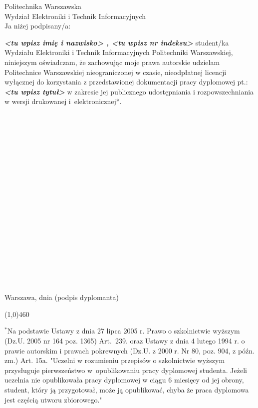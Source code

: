 \newpage
\thispagestyle{empty}
\phantom{Nothing here}
\newpage
\clearpage
\phantom{Here neither}

\setcounter{page}{9}
\vspace{-1.5cm}
\begin{flushleft}
	Politechnika Warszawska \\ 
	Wydział Elektroniki i Technik Informacyjnych  \\
	\vspace{0.5cm}
	Ja niżej podpisany/a: 
\end{flushleft}
\center \textit{\textbf{<tu wpisz imię i nazwisko> , <tu wpisz nr indeksu> }} %
\justify student/ka Wydziału Elektroniki i Technik Informacyjnych Politechniki Warszawskiej, niniejszym oświadczam, że zachowując moje prawa autorskie udzielam Politechnice Warszawskiej nieograniczonej w czasie, nieodpłatnej licencji wyłącznej do korzystania z przedstawionej dokumentacji pracy dyplomowej pt.:
\center \textit{\textbf{ <tu wpisz tytuł> }} 
\justify w zakresie jej publicznego udostępniania i rozpowszechniania w wersji drukowanej i~elektronicznej*.
\\~\\~\\~\\~\\~\\~\\~\\~\\~\\~\\~\\~\\~\\~\\~\\~\\~\\~\\~\\
Warszawa, dnia  \hfill (podpis dyplomanta) 

\begin{center}
	\color{sapphire}
	\line(1,0){460}
\end{center}
\footnotesize \noindent $^{*}$Na podstawie Ustawy z dnia 27 lipca 2005 r. Prawo o szkolnictwie wyższym (Dz.U. 2005 nr 164 poz. 1365) Art.~239. oraz Ustawy z dnia 4 lutego 1994 r. o prawie autorskim i prawach pokrewnych (Dz.U. z 2000 r. Nr 80, poz. 904, z późn. zm.) Art. 15a. "Uczelni w rozumieniu przepisów o szkolnictwie wyższym przysługuje pierwszeństwo w~opublikowaniu pracy dyplomowej studenta. Jeżeli uczelnia nie opublikowała pracy dyplomowej w ciągu 6 miesięcy od jej obrony, student, który ją przygotował, może ją opublikować, chyba że praca dyplomowa jest częścią utworu zbiorowego."

\newpage
\thispagestyle{empty}
\phantom{Nothing here}

